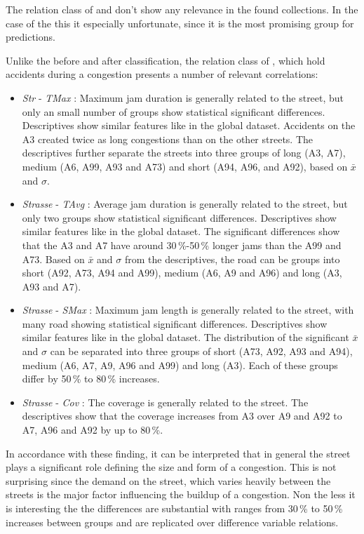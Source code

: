 The relation class of  and  don't show any relevance in the found collections. In the case of the  this it especially unfortunate, since it is the most promising group for predictions.

Unlike the before and after classification, the relation class of , which hold accidents during a congestion presents a number of relevant correlations:
\begin{itemize}
    \item \textit{Str} - \textit{TMax} : Maximum jam duration is generally related to the street, but only an small number of groups show statistical significant differences. Descriptives show similar features like in the global dataset. Accidents on the A3 created twice as long congestions than on the other streets. The descriptives further separate the streets into three groups of long (A3, A7), medium (A6, A99, A93 and A73) and short (A94, A96, and A92), based on $\bar{x}$ and $\sigma$.
    \item \textit{Strasse} - \textit{TAvg} : Average jam duration is generally related to the street, but only two groups show statistical significant differences. Descriptives show similar features like in the global dataset. The significant differences show that the A3 and A7 have around 30\,\%-50\,\% longer jams than the A99 and A73. Based on $\bar{x}$ and $\sigma$ from the descriptives, the road can be groups into short (A92, A73, A94 and A99), medium (A6, A9 and A96) and long (A3, A93 and A7).
    \item \textit{Strasse} - \textit{SMax} : Maximum jam length is generally related to the street, with many road showing statistical significant differences. Descriptives show similar features like in the global dataset. The distribution of the significant $\bar{x}$ and $\sigma$ can be separated into three groups of short (A73, A92, A93 and A94), medium (A6, A7, A9, A96 and A99) and long (A3). Each of these groups differ by 50\,\% to 80\,\% increases.
    \item \textit{Strasse} - \textit{Cov} : The coverage is generally related to the street. The descriptives show that the coverage increases from A3 over A9 and A92 to A7, A96 and A92 by up to 80\,\%.
\end{itemize}

In accordance with these finding, it can be interpreted that in general the street plays a significant role defining the size and form of a congestion. This is not surprising since the demand on the street, which varies heavily between the streets is the major factor influencing the buildup of a congestion. Non the less it is interesting the the differences are substantial with ranges from 30\,\% to 50\,\% increases between groups and are replicated over difference variable relations.


